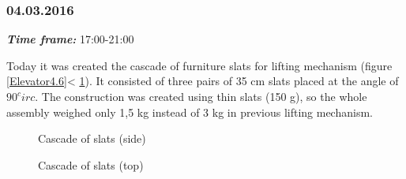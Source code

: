 \subsubsection{04.03.2016}
\textit{\textbf{Time frame:}} 17:00-21:00 

Today it was created the cascade of furniture slats for lifting mechanism (figure \ref{Elevator4.6}< \ref{Elevator4.7}). It consisted of three pairs of 35 cm slats placed at the angle of $90^circ$. The construction was created using thin slats (150 g), so the whole assembly weighed only 1,5 kg instead of 3 kg in previous lifting mechanism.

\begin{figure}[H]
	\begin{minipage}[h]{1\linewidth}
		\caption{Cascade of slats (side)}
		\label{Elevator4.6}
	\end{minipage}
	\vfill
	\begin{minipage}[h]{1\linewidth}
		\caption{Cascade of slats (top)}
		\label{Elevator4.7}
	\end{minipage}
\end{figure}
